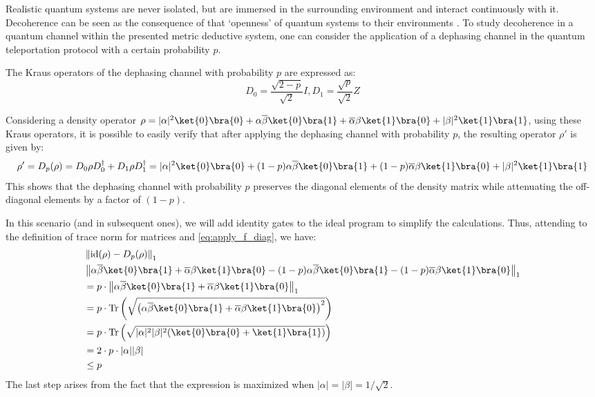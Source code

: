 \begin{example}
     Realistic quantum systems are never isolated, but are immersed in the surrounding environment and interact continuously with it. Decoherence can be seen as the consequence of that  `openness' of quantum systems to their  environments .  To study decoherence in a quantum channel within the presented metric deductive system, one can consider the application of a dephasing channel in the quantum teleportation protocol with a certain probability $p$.
     
     The Kraus operators of the dephasing channel with probability $p$ are expressed as:
     \begin{equation*}
          D_{0}= \frac{\sqrt{2-p}}{\sqrt{2}} I,  D_{1}= \frac{\sqrt{p}}{\sqrt{2}} Z
     \end{equation*}
     
     Considering a density operator $\rho=|\alpha|^{2} \ket{0} \bra{0} + \alpha \overline{\beta} \ket{0} \bra{1}+ \overline{\alpha} \beta \ket{1} \bra{0} + |\beta|^{2} \ket{1} \bra{1}$, using these Kraus operators, it is possible to easily verify  that after applying the dephasing channel with probability $p$, the resulting operator $\rho'$ is given by: 
     \begin{equation*} 
          \rho' = D_p(\rho)= D_{0} \rho D_{0}^{\dag} + D_{1} \rho D_{1}^{\dag} = |\alpha|^{2} \ket{0} \bra{0} +  (1-p) \alpha \overline{\beta} \ket{0} \bra{1}+  (1-p) \overline{\alpha}  \beta \ket{1} \bra{0} + |\beta|^{2} \ket{1} \bra{1}
     \end{equation*}
     This shows that the dephasing channel with probability $p$ preserves the diagonal elements of the density matrix while attenuating the off-diagonal elements by a factor of $(1-p)$.

     In this scenario (and in subsequent ones), we will add identity gates to the ideal program to simplify the calculations. Thus, attending to the definition of trace norm for matrices and \autoref{eq:apply_f_diag}, we have:
     \begin{align*}
      & \tracenorm{ \id(\rho) - D_{p}(\rho)} \\
      & \tracenorm{ \alpha \overline{\beta} \ket{0} \bra{1}+ \overline{\alpha} \beta \ket{1} \bra{0}  -   (1-p) \alpha \overline{\beta} \ket{0} \bra{1}-  (1-p) \overline{\alpha}  \beta \ket{1} \bra{0} } \\
      & = p \cdot  \tracenorm{ \alpha \overline{\beta} \ket{0} \bra{1} + \overline{\alpha}  \beta \ket{1} \bra{0} } \\
      & = p \cdot \tr \left(\sqrt{\left( \alpha \overline{\beta} \ket{0} \bra{1} + \overline{\alpha}  \beta \ket{1} \bra{0} \right)^2} \right) \\
      & = p \cdot  \tr \left(\sqrt{|\alpha|^{2}|\beta|^{2} (\ket{0} \bra{0}+ \ket{1} \bra{1})  } \right) \\
      & = 2 \cdot p \cdot |\alpha||\beta| \\
      & \leq p \\
     \end{align*}
     The last step arises from the fact that the expression is maximized when $|\alpha|=|\beta|=1/\sqrt{2}$.


\end{example}
